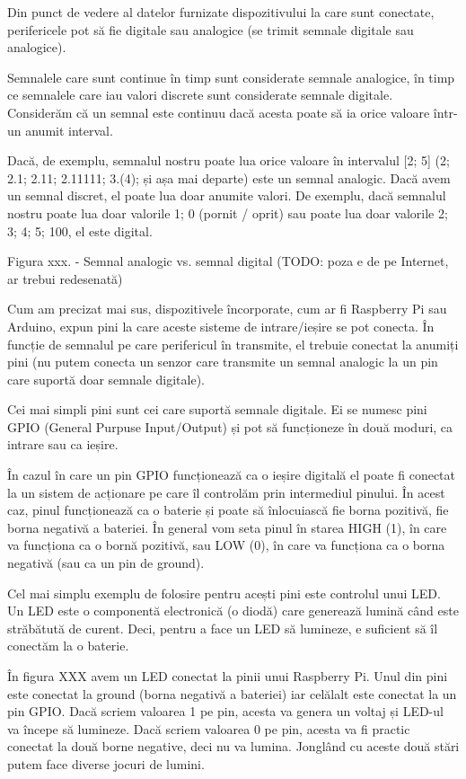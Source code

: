 Din punct de vedere al datelor furnizate dispozitivului la care sunt conectate,
perifericele pot să fie digitale sau analogice (se trimit semnale digitale sau
analogice).

Semnalele care sunt continue în timp sunt considerate semnale analogice, în timp
ce semnalele care iau valori discrete sunt considerate semnale digitale.
Considerăm că un semnal este continuu dacă acesta poate să ia orice valoare
într-un anumit interval.

Dacă, de exemplu, semnalul nostru poate lua orice valoare în intervalul [2; 5]
(2; 2.1; 2.11; 2.11111; 3.(4); și așa mai departe) este un semnal analogic. Dacă
avem un semnal discret, el poate lua doar anumite valori. De exemplu, dacă
semnalul nostru poate lua doar valorile {1; 0} (pornit / oprit) sau poate lua
doar valorile {2; 3; 4; 5; 100}, el este digital.

Figura xxx. - Semnal analogic vs. semnal digital (TODO: poza e de pe Internet,
ar trebui redesenată)

Cum am precizat mai sus, dispozitivele încorporate, cum ar fi Raspberry Pi sau
Arduino, expun pini la care aceste sisteme de intrare/ieșire se pot conecta. În
funcție de semnalul pe care perifericul în transmite, el trebuie conectat la
anumiți pini (nu putem conecta un senzor care transmite un semnal analogic la un
pin care suportă doar semnale digitale).

Cei mai simpli pini sunt cei care suportă semnale digitale. Ei se numesc pini
GPIO (General Purpuse Input/Output) și pot să funcționeze în două moduri, ca
intrare sau ca ieșire.

În cazul în care un pin GPIO funcționează ca o ieșire digitală el poate fi
conectat la un sistem de acționare pe care îl controlăm prin intermediul
pinului. În acest caz, pinul funcționează ca o baterie și poate să înlocuiască
fie borna pozitivă, fie borna negativă a bateriei. În general vom seta pinul în
starea HIGH (1), în care va funcționa ca o bornă pozitivă, sau LOW (0), în care
va funcționa ca o borna negativă (sau ca un pin de ground).

Cel mai simplu exemplu de folosire pentru acești pini este controlul unui LED.
Un LED este o componentă electronică (o diodă) care generează lumină când este
străbătută de curent. Deci, pentru a face un LED să lumineze, e suficient să îl
conectăm la o baterie.

În figura XXX avem un LED conectat la pinii unui Raspberry Pi. Unul din pini
este conectat la ground (borna negativă a bateriei) iar celălalt este conectat
la un pin GPIO. Dacă scriem valoarea 1 pe pin, acesta va genera un voltaj și
LED-ul va începe să lumineze. Dacă scriem valoarea 0 pe pin, acesta va fi
practic conectat la două borne negative, deci nu va lumina. Jonglând cu aceste
două stări putem face diverse jocuri de lumini.

